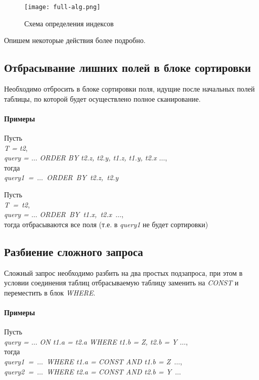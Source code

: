 \begin{figure}[h!]
  \centering
  \texttt{[image: full-alg.png]}
  \caption{Схема определения индексов}
  \label{img:full-alg}
\end{figure}

\indent
Опишем некоторые действия более подробно.





\subsection{Отбрасывание лишних полей в блоке сортировки}

Необходимо отбросить в блоке сортировки поля, идущие после начальных полей таблицы, по которой будет осуществлено полное сканирование.

\paragraph{Примеры}

Пусть\\
\textit{T = t2},\\
\textit{query = $\ldots$ ORDER BY t2.z, t2.y, t1.z, t1.y, t2.x $\ldots$},\\
тогда \\
\textit{query1 = $\ldots$ ORDER BY t2.z, t2.y}

Пусть \\
\textit{T = t2},\\
\textit{query = $\ldots$ ORDER BY t1.x, t2.x $\ldots$},\\
тогда отбрасываются все поля (т.е. в \textit{query1} не будет сортировки)


\subsection{Разбиение сложного запроса}

Сложный запрос необходимо разбить на два простых подзапроса, при этом в условии соединения таблиц отбрасываемую таблицу заменить на \textit{CONST} и переместить в блок \textit{WHERE}.

\paragraph{Примеры}

Пусть \\
\textit{query = $\ldots$ ON t1.a = t2.a WHERE t1.b = Z, t2.b = Y $\ldots$},\\
тогда\\
\textit{query1 = $\ldots$ WHERE t1.a = CONST AND t1.b = Z $\ldots$}, \\
\textit{query2 = $\ldots$ WHERE t2.a = CONST AND t2.b = Y $\ldots$}


